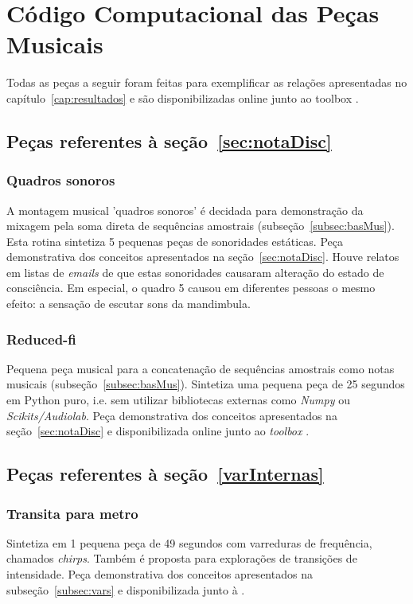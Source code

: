 \chapter{Código Computacional das Peças Musicais}
\label{cap:codigoPecas}
Todas as peças a seguir foram feitas para exemplificar as relações apresentadas no capítulo~\ref{cap:resultados} e são disponibilizadas online junto ao toolbox \massa.\cite{MASSA}

\clearpage
\section{Peças referentes à seção~\ref{sec:notaDisc}}

\subsection{Quadros sonoros}\label{ap:quadros}
A montagem musical 'quadros sonoros' é decidada para demonstração da mixagem pela soma direta de sequências amostrais (subseção~\ref{subsec:basMus}). Esta rotina sintetiza 5 pequenas peças de sonoridades estáticas. Peça demonstrativa dos conceitos apresentados na seção~\ref{sec:notaDisc}. Houve relatos em listas de \emph{emails} de que estas sonoridades causaram alteração do estado de consciência. Em especial, o quadro 5 causou em diferentes pessoas o mesmo efeito: a sensação de escutar sons da mandimbula. 

\clearpage


\subsection{Reduced-fi}\label{ap:reduced}
Pequena peça musical para a concatenação de sequências amostrais como notas musicais (subseção~\ref{subsec:basMus}). Sintetiza uma pequena peça de 25 segundos em Python puro, i.e. sem utilizar bibliotecas externas como \emph{Numpy} ou \emph{Scikits/Audiolab}. Peça demonstrativa dos conceitos apresentados na seção~\ref{sec:notaDisc} e disponibilizada online junto ao \emph{toolbox} \massa.\cite{MASSA}


\clearpage
\section{Peças referentes à seção~\ref{varInternas}}

\subsection{Transita para metro}\label{ap:transita}
Sintetiza em 1 pequena peça de 49 segundos com varreduras de frequência, chamados \emph{chirps}. Também é proposta para explorações de transições de intensidade. Peça demonstrativa dos conceitos apresentados na subseção~\ref{subsec:vars} e disponibilizada junto à \massa.\cite{MASSA}

